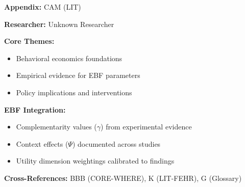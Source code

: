 \begin{tcolorbox}[colback=blue!5!white, colframe=blue!75!black,
    title=Quick Reference: Unknown Researcher Research]

\textbf{Appendix:} CAM (LIT)

\textbf{Researcher:} Unknown Researcher

\textbf{Core Themes:}
\begin{itemize}[nosep]
\item Behavioral economics foundations
\item Empirical evidence for EBF parameters
\item Policy implications and interventions
\end{itemize}

\textbf{EBF Integration:}
\begin{itemize}[nosep]
\item Complementarity values ($\gamma$) from experimental evidence
\item Context effects ($\Psi$) documented across studies
\item Utility dimension weightings calibrated to findings
\end{itemize}

\textbf{Cross-References:} BBB (CORE-WHERE), K (LIT-FEHR), G (Glossary)
\end{tcolorbox}



